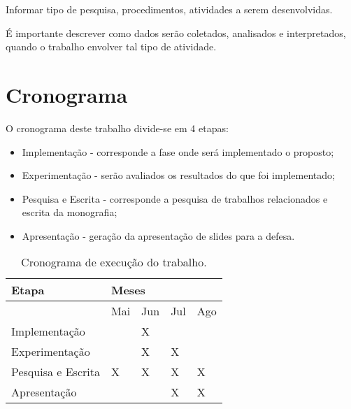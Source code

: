 \documentclass[prop-esp]{iiufrgs}
\begin{document}
Informar tipo de pesquisa, procedimentos, atividades a serem desenvolvidas.

É importante descrever como dados serão coletados, analisados e interpretados, quando o trabalho envolver tal tipo de atividade.

%
\chapter{Cronograma}

O cronograma deste trabalho divide-se em 4 etapas:

\begin{itemize}
    \item Implementação - corresponde a fase onde será implementado o proposto;
    \item Experimentação - serão avaliados os resultados do que foi implementado;
    \item Pesquisa e Escrita - corresponde a pesquisa de trabalhos relacionados e escrita da monografia;
    \item Apresentação - geração da apresentação de slides para a defesa.
\end{itemize}

\begin{table}[H]
    \centering
    \begin{tabular}{|p{1.8in}|p{0.5in}|p{0.5in}|p{0.5in}|p{0.5in}|} \hline 
Etapa & \multicolumn{4}{|p{2.0in}|}{Meses} \\ \hline 
 & Mai & Jun & Jul & Ago  \\ \hline 
Implementação &  & X &  &   \\ \hline 
Experimentação &  & X & X &   \\ \hline 
Pesquisa e Escrita & X & X & X & X  \\ \hline 
Apresentação &  &  & X & X  \\ \hline 
\end{tabular}
    \caption{Cronograma de execução do trabalho.}
    \label{tab:cronog}
\end{table}



%


\end{document}
